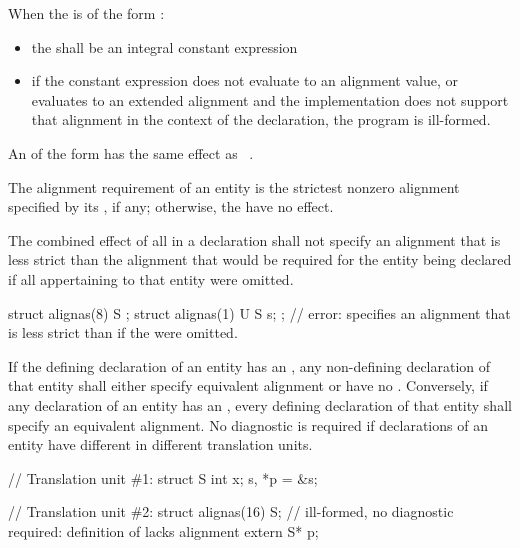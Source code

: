\pnum
When the  is of the form
  \tcode{)}:
\begin{itemize}
\item the  shall be an integral constant expression

\item if the constant expression does not evaluate to an alignment
value, or evaluates to an extended alignment and
the implementation does not support that alignment in the context of the
declaration, the program is ill-formed.
\end{itemize}

\pnum
An  of the form
  \tcode{)} has the same
effect as  ~\tcode{))}.

\pnum
The alignment requirement of an entity is the strictest nonzero alignment
specified by its , if any;
otherwise, the  have no effect.

\pnum
The combined effect of all  in a declaration shall not
specify an alignment that is less strict than the alignment that would
be required for the entity being declared if all 
appertaining to that entity
were omitted.
\begin{example}
\begin{codeblock}
struct alignas(8) S {};
struct alignas(1) U {
  S s;
};  // error:  specifies an alignment that is less strict than if the  were omitted.
\end{codeblock}
\end{example}

\pnum
If the defining declaration of an entity has an
, any non-defining
declaration of that entity shall either specify equivalent alignment or have no
.
Conversely, if any declaration of an entity has an
,
every defining
declaration of that entity shall specify an equivalent alignment.
No diagnostic is required if declarations of an entity have
different 
in different translation units.
\begin{example}
\begin{codeblock}
// Translation unit \#1:
struct S { int x; } s, *p = &s;

// Translation unit \#2:
struct alignas(16) S;           // ill-formed, no diagnostic required: definition of  lacks alignment
extern S* p;
\end{codeblock}
\end{example}

